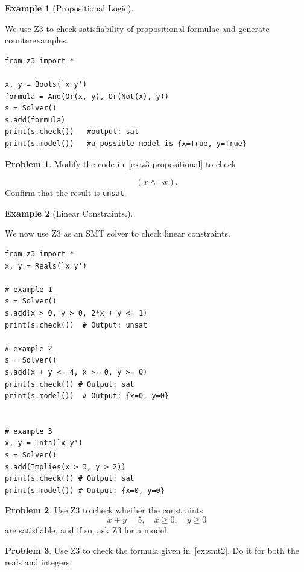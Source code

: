 \documentclass[oneside,11pt,dvipsnames]{book}
\numberwithin{equation}{section}
\theoremstyle{definition}
\newtheorem{example}{Example}[section]
\newtheorem{problem}{Problem}[section]
\theoremstyle{remark}
\begin{document}
\begin{example}[Propositional Logic]\label{ex:z3-propositional}

We use Z3 to check satisfiability of propositional formulae and generate counterexamples.

\begin{lstlisting}
from z3 import *

x, y = Bools(`x y')
formula = And(Or(x, y), Or(Not(x), y))
s = Solver()
s.add(formula)
print(s.check())   #output: sat
print(s.model())   #a possible model is {x=True, y=True}
\end{lstlisting}
\end{example}

\begin{problem}\label{prob:z3-0}
Modify the code in~\autoref{ex:z3-propositional} to check

\[
(x \land \lnot x).
\]
Confirm that the result is \texttt{unsat}.
\end{problem}




\begin{example}[Linear Constraints.]\label{ex:z3-linear-constraints}

We now use Z3 as an SMT solver to check linear constraints.

    \begin{lstlisting}
from z3 import *
x, y = Reals(`x y')

# example 1
s = Solver()
s.add(x > 0, y > 0, 2*x + y <= 1)
print(s.check())  # Output: unsat

# example 2
s = Solver()
s.add(x + y <= 4, x >= 0, y >= 0)
print(s.check()) # Output: sat
print(s.model())  # Output: {x=0, y=0}


# example 3
x, y = Ints(`x y')
s = Solver()
s.add(Implies(x > 3, y > 2))
print(s.check()) # Output: sat
print(s.model()) # Output: {x=0, y=0}
\end{lstlisting}
\end{example}

\begin{problem}\label{prob:z3-1}
Use Z3 to check whether the constraints
\[
x+y=5, \quad x \geq 0, \quad y \geq 0
\]
are satisfiable, and if so, ask Z3 for a model.
\end{problem}

\begin{problem}\label{prob:z3-2}
Use Z3 to check the formula given in~\autoref{ex:smt2}. Do it for both the reals and integers.
\end{problem}
\end{document}
